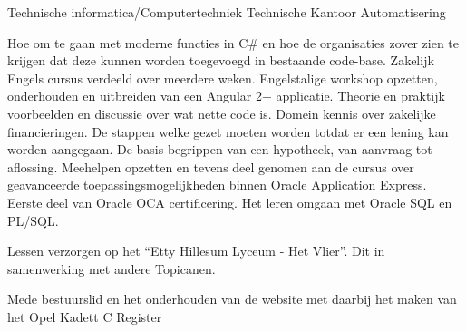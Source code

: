 \documentclass[
	a4paper,
	nameandjobposition=before,
	profilepicstyle=profilecircle
]{babelviscv}
\begin{document}
	\begin{cvtable}[1.5]
			{Technische informatica/Computertechniek}
			{Technische Kantoor Automatisering}
	\end{cvtable}

	\begin{cvtable}[1.5]
			{Hoe om te gaan met moderne functies in C\# en hoe de organisaties zover zien te krijgen dat deze kunnen worden toegevoegd in bestaande code-base.}
			{Zakelijk Engels cursus verdeeld over meerdere weken.}
			{Engelstalige workshop opzetten, onderhouden en uitbreiden van een Angular 2+ applicatie.}
			{Theorie en praktijk voorbeelden en discussie over wat nette code is.}
			{Domein kennis over zakelijke financieringen. De stappen welke gezet moeten worden totdat er een lening kan worden aangegaan.}
			{De basis begrippen van een hypotheek, van aanvraag tot aflossing.}
			{Meehelpen opzetten en tevens deel genomen aan de cursus over geavanceerde toepassingsmogelijkheden binnen Oracle Application Express.}
			{Eerste deel van Oracle OCA certificering.}
			{Het leren omgaan met Oracle SQL en PL/SQL.}
	\end{cvtable}

		\begin{cvtable}[1.5]
				{Lessen verzorgen op het “Etty Hillesum Lyceum - Het Vlier”. Dit in samenwerking met andere Topicanen.}
		\end{cvtable}

		\begin{cvtable}[1.5]
				{Mede bestuurslid en het onderhouden van de website met daarbij het maken van het Opel Kadett C Register}
		\end{cvtable}

\cvsignature
\end{document}
